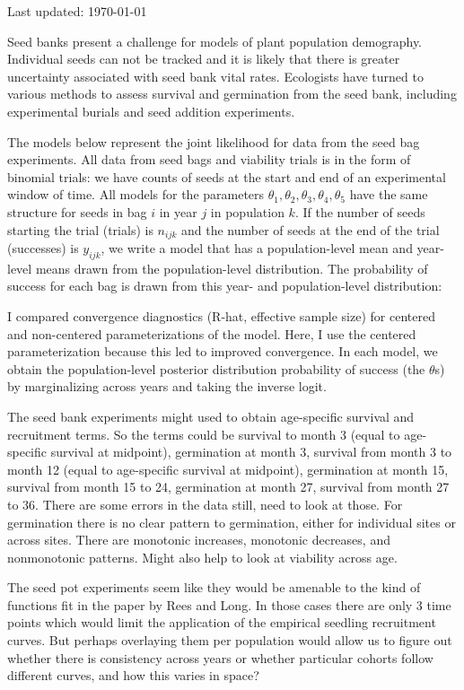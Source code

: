 \documentclass[12pt, oneside, titlepage]{article}   	%
\begin{document}
Last updated: \today

Seed banks present a challenge for models of plant population demography. Individual seeds can not be tracked and it is likely that there is greater uncertainty associated with seed bank vital rates. Ecologists have turned to various methods to assess survival and germination from the seed bank, including experimental burials and seed addition experiments.


The models below represent the joint likelihood for data from the seed bag experiments. All data from seed bags and viability trials is in the form of binomial trials: we have counts of seeds at the start and end of an experimental window of time. All models for the parameters $\theta_1, \theta_2, \theta_3, \theta_4, \theta_5$ have the same structure for seeds in bag $i$ in year $j$ in population $k$. If the number of seeds starting the trial (trials) is $n_{ijk}$ and the number of seeds at the end of the trial (successes) is $y_{ijk}$, we write a model that has a population-level mean and year-level means drawn from the population-level distribution. The probability of success for each bag is drawn from this year- and population-level distribution:

I compared convergence diagnostics (R-hat, effective sample size) for centered and non-centered parameterizations of the model. Here, I use the centered parameterization because this led to improved convergence. In each model, we obtain the population-level posterior distribution probability of success (the $\theta$s) by marginalizing across years and taking the inverse logit.

The seed bank experiments might used to obtain age-specific survival and recruitment terms. So the terms could be survival to month 3 (equal to age-specific survival at midpoint), germination at month 3, survival from month 3 to month 12 (equal to age-specific survival at midpoint), germination at month 15, survival from month 15 to 24, germination at month 27, survival from month 27 to 36. There are some errors in the data still, need to look at those. For germination there is no clear pattern to germination, either for individual sites or across sites. There are monotonic increases, monotonic decreases, and nonmonotonic patterns. Might also help to look at viability across age. 

The seed pot experiments seem like they would be amenable to the kind of functions fit in the paper by Rees and Long. In those cases there are only 3 time points which would limit the application of the empirical seedling recruitment curves. But perhaps overlaying them per population would allow us to figure out whether there is consistency across years or whether particular cohorts follow different curves, and how this varies in space?
\end{document}

